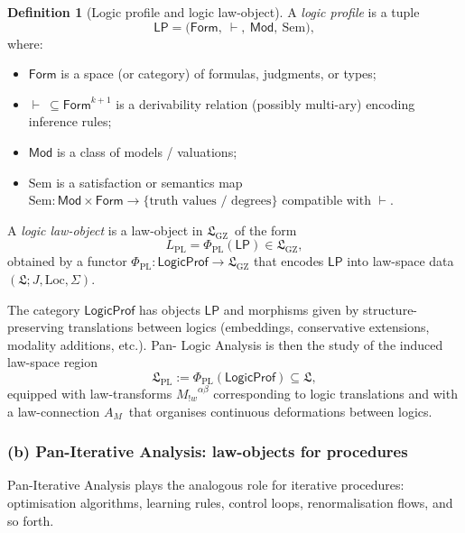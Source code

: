 \documentclass[11pt]{book}
\theoremstyle{plain}
\theoremstyle{definition}
\newtheorem{definition}[theorem]{Definition} \theoremstyle{remark}
\newcommand{\GZLS}{\ensuremath{\mathfrak{L}_{\mathrm{GZ}}}}       \newcommand{\GZLT}{\ensuremath{M_{!w}}}                           \newcommand{\GZLOC}{\ensuremath{A_M}}                             \newcommand{\GZLCurv}{\ensuremath{\mathcal{F}_{\mathrm{law}}}}
\begin{document}
\begin{definition}[Logic profile and logic law-object]
A \emph{logic profile} is a tuple
  \[
    \mathsf{LP}
    =
    \bigl(
      \mathsf{Form},\ \vdash,\ 
      \mathsf{Mod},\ \mathrm{Sem}
    \bigr),
  \]
  where:
  \begin{itemize}
    \item $\mathsf{Form}$ is a space (or category) of formulas,
          judgments, or types;
    \item $\vdash\ \subseteq \mathsf{Form}^{k+1}$ is a derivability
          relation (possibly multi-ary) encoding inference rules;
    \item $\mathsf{Mod}$ is a class of models / valuations;
    \item $\mathrm{Sem}$ is a satisfaction or semantics map
          $\mathrm{Sem}:\mathsf{Mod}\times\mathsf{Form}\to\{\text{truth
          values / degrees}\}$ compatible with $\vdash$.
  \end{itemize}
  A \emph{logic law-object} is a law-object in \GZLS\ of the form
  \[
    L_{\mathrm{PL}}
    =
    \Phi_{\mathrm{PL}}(\mathsf{LP})
    \in\GZLS,
  \]
  obtained by a functor
  \(
    \Phi_{\mathrm{PL}}:\mathsf{LogicProf}\to\GZLS
  \)
  that encodes $\mathsf{LP}$ into law-space data
  $(\mathfrak{L};J,\mathrm{Loc},\Sigma)$.
\end{definition}

The category $\mathsf{LogicProf}$ has objects $\mathsf{LP}$ and
morphisms given by structure-preserving translations between logics
(embeddings, conservative extensions, modality additions, etc.). Pan-
Logic Analysis is then the study of the induced law-space region
\[
   \mathfrak{L}_{\mathrm{PL}}
   :=
   \Phi_{\mathrm{PL}}(\mathsf{LogicProf})
   \subseteq\mathfrak{L},
\]
equipped with law-transforms $\GZLT^{\alpha\beta}$ corresponding to
logic translations and with \\ a law-connection \GZLOC\ that organises
continuous deformations between logics.



\subsubsection*{(b) Pan-Iterative Analysis: law-objects for procedures}

Pan-Iterative Analysis plays the analogous role for iterative
procedures: optimisation algorithms, learning rules, control loops,
renormalisation flows, and so forth.
\end{document}
